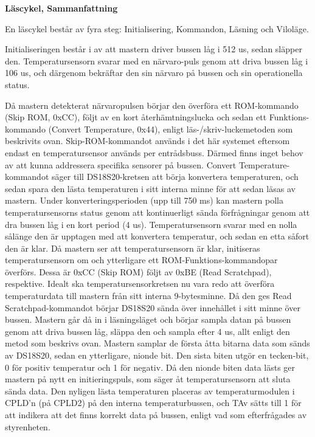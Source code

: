 \documentclass[a4paper,11pt]{article}
\begin{document}
{\noindent \bf Läscykel, Sammanfattning}

En läscykel består av fyra steg: Initialisering, Kommandon, Läsning och Viloläge.

Initialiseringen består i av att mastern driver bussen låg i 512 us, sedan släpper den.
Temperatursensorn svarar med en närvaro-puls genom att driva bussen låg i 106 us, och därgenom bekräftar den sin närvaro
på bussen och sin operationella status.

Då mastern detekterat närvaropulsen börjar den överföra ett ROM-kommando (Skip ROM, 0xCC), följt av en kort återhämtningslucka
och sedan ett Funktions-kommando (Convert Temperature, 0x44), enligt läs-/skriv-luckemetoden som beskrivits ovan.
Skip-ROM-kommandot används i det här systemet eftersom endast en temperatursensor används per entrådsbuss.
Därmed finns inget behov av att kunna addressera specifika sensorer på bussen.
Convert Temperature-kommandot säger till DS18S20-kretsen att börja konvertera temperaturen, och sedan spara den 
lästa temperaturen i sitt interna minne för att sedan läsas av mastern.
Under konverteringsperioden (upp till 750 ms) kan mastern polla temperatursensorns status genom att kontinuerligt
sända förfrågningar genom att dra bussen låg i en kort period (4 us). Temperatursensorn svarar med en nolla
sålänge den är upptagen med att konvertera temperatur, och sedan en etta såfort den är klar.
Då mastern ser att temperatursensorn är klar, initiseras temperatursensorn om och ytterligare ett ROM-Funktions-kommandopar
överförs. Dessa är 0xCC (Skip ROM) följt av 0xBE (Read Scratchpad), respektive.
Idealt ska temperatursensorkretsen nu vara redo att överföra temperaturdata till mastern från sitt interna 9-bytesminne.
Då den ges Read Scratchpad-kommandot börjar DS18S20 sända över innehållet i sitt minne över bussen.
Mastern går då in i läsningsläget och börjar sampla datan på bussen genom att driva bussen låg, släppa den och sampla efter 4 us,
allt enligt den metod som beskrivs ovan. Mastern samplar de första åtta bitarna data som sänds av DS18S20, sedan en ytterligare,
nionde bit. Den sista biten utgör en tecken-bit, 0 för positiv temperatur och 1 för negativ. Då den nionde biten data lästs
ger mastern på nytt en initieringspuls, som säger åt temperatursensorn att sluta sända data.
Den nyligen lästa temperaturen placeras av temperaturmodulen i CPLD'n (på CPLD2) på den interna temperaturbussen, och
TAv sätts till 1 för att indikera att det finns korrekt data på bussen, enligt vad som efterfrågades av styrenheten.\\
\end{document}

